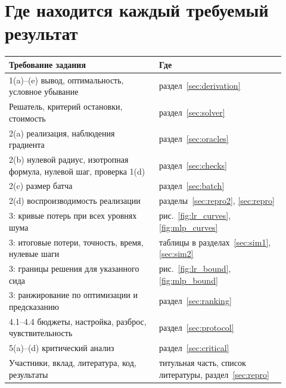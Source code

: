\documentclass[11pt,a4paper]{article}
\begin{document}
\section{Где находится каждый требуемый результат}\label{app:map}
\begin{center}
\small
\begin{tabular}{@{}p{0.5\linewidth}p{0.42\linewidth}@{}}
\toprule
Требование задания & Где \\
\midrule
1(a)--(e) вывод, оптимальность, условное убывание & раздел~\ref{sec:derivation} \\
Решатель, критерий остановки, стоимость & раздел~\ref{sec:solver} \\
2(a) реализация, наблюдения градиента & раздел~\ref{sec:oracles} \\
2(b) нулевой радиус, изотропная формула, нулевой шаг, проверка 1(d) & раздел~\ref{sec:checks} \\
2(c) размер батча & раздел~\ref{sec:batch} \\
2(d) воспроизводимость реализации & разделы~\ref{sec:repro2}, \ref{sec:repro} \\
3: кривые потерь при всех уровнях шума & рис.~\ref{fig:lr_curves}, \ref{fig:mlp_curves} \\
3: итоговые потери, точность, время, нулевые шаги & таблицы в разделах~\ref{sec:sim1}, \ref{sec:sim2} \\
3: границы решения для указанного сида & рис.~\ref{fig:lr_bound}, \ref{fig:mlp_bound} \\
3: ранжирование по оптимизации и предсказанию & раздел~\ref{sec:ranking} \\
4.1--4.4 бюджеты, настройка, разброс, чувствительность & раздел~\ref{sec:protocol} \\
5(a)--(d) критический анализ & раздел~\ref{sec:critical} \\
Участники, вклад, литература, код, результаты & титульная часть, список литературы, раздел~\ref{sec:repro} \\
\bottomrule
\end{tabular}
\end{center}
\end{document}
